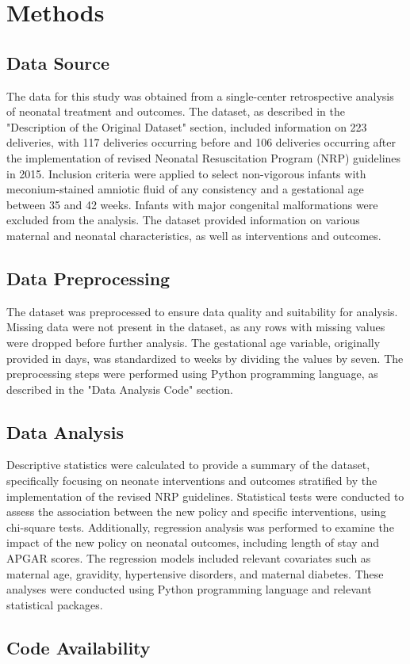\documentclass[11pt]{article}
\begin{document}
\section*{Methods}

\subsection*{Data Source}
The data for this study was obtained from a single-center retrospective analysis of neonatal treatment and outcomes. The dataset, as described in the "Description of the Original Dataset" section, included information on 223 deliveries, with 117 deliveries occurring before and 106 deliveries occurring after the implementation of revised Neonatal Resuscitation Program (NRP) guidelines in 2015. Inclusion criteria were applied to select non-vigorous infants with meconium-stained amniotic fluid of any consistency and a gestational age between 35 and 42 weeks. Infants with major congenital malformations were excluded from the analysis. The dataset provided information on various maternal and neonatal characteristics, as well as interventions and outcomes.

\subsection*{Data Preprocessing}
The dataset was preprocessed to ensure data quality and suitability for analysis. Missing data were not present in the dataset, as any rows with missing values were dropped before further analysis. The gestational age variable, originally provided in days, was standardized to weeks by dividing the values by seven. The preprocessing steps were performed using Python programming language, as described in the "Data Analysis Code" section.

\subsection*{Data Analysis}
Descriptive statistics were calculated to provide a summary of the dataset, specifically focusing on neonate interventions and outcomes stratified by the implementation of the revised NRP guidelines. Statistical tests were conducted to assess the association between the new policy and specific interventions, using chi-square tests. Additionally, regression analysis was performed to examine the impact of the new policy on neonatal outcomes, including length of stay and APGAR scores. The regression models included relevant covariates such as maternal age, gravidity, hypertensive disorders, and maternal diabetes. These analyses were conducted using Python programming language and relevant statistical packages.\subsection*{Code Availability}
\end{document}
